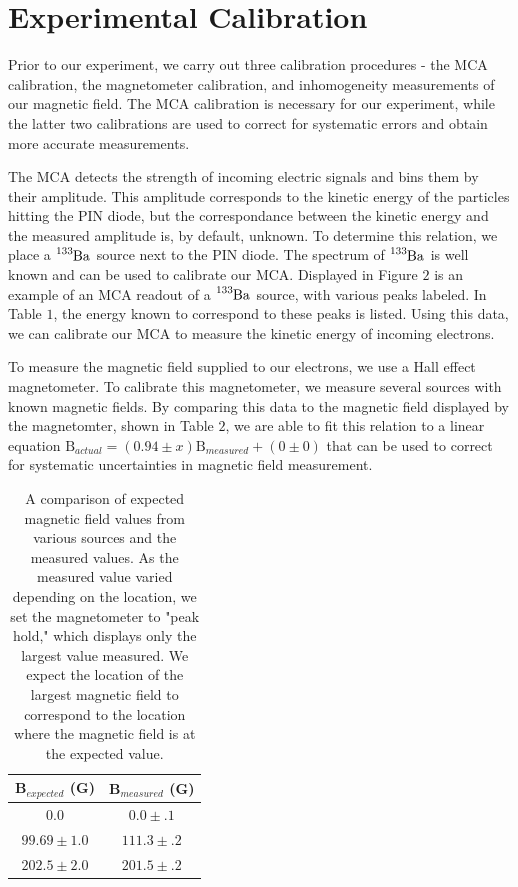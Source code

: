 \section{Experimental Calibration}
Prior to our experiment, we carry out three calibration procedures - the MCA calibration, the magnetometer calibration, and inhomogeneity measurements of our magnetic field. The MCA calibration is necessary for our experiment, while the latter two calibrations are used to correct for systematic errors and obtain more accurate measurements.

The MCA detects the strength of incoming electric signals and bins them by their amplitude. This amplitude corresponds to the kinetic energy of the particles hitting the PIN diode, but the correspondance between the kinetic energy and the measured amplitude is, by default, unknown. To determine this relation, we place a $\tensor*[^{133}]{\text{Ba}}{}$ source next to the PIN diode. The spectrum of $\tensor*[^{133}]{\text{Ba}}{}$ is well known and can be used to calibrate our MCA. Displayed in Figure $2$ is an example of an MCA readout of a $\tensor*[^{133}]{\text{Ba}}{}$ source, with various peaks labeled. In Table $1$, the energy known to correspond to these peaks is listed. Using this data, we can calibrate our MCA to measure the kinetic energy of incoming electrons. 

To measure the magnetic field supplied to our electrons, we use a Hall effect magnetometer. To calibrate this magnetometer, we measure several sources with known magnetic fields. By comparing this data to the magnetic field displayed by the magnetomter, shown in Table $2$, we are able to fit this relation to a linear equation $\text{B}_{actual} = (0.94 \pm x)\text{B}_{measured} + (0 \pm 0)$ that can be used to correct for systematic uncertainties in magnetic field measurement. 
\begin{table}[h]
  \caption{A comparison of expected magnetic field values from various sources and the measured values. As the measured value varied depending on the location, we set the magnetometer to "peak hold," which displays only the largest value measured. We expect the location of the largest magnetic field to correspond to the location where the magnetic field is at the expected value.}
  \begin{ruledtabular}
    \begin{tabular}{cc}
      B$_{expected}$ (G)&B$_{measured}$ (G)\\
      \hline
      $0.0$ & $0.0 \pm .1$ \\
      $99.69 \pm 1.0$ & $111.3 \pm .2$ \\
      $202.5 \pm 2.0$ & $201.5 \pm .2$ \\
    \end{tabular}
  \end{ruledtabular}
\end{table}

